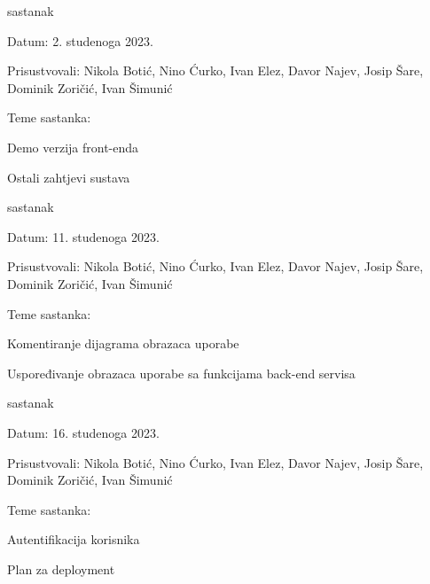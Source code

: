 \begin{packed_enum}
		
		\item  sastanak
			\item[] \begin{packed_item}
				\item Datum: 2. studenoga 2023.
				\item Prisustvovali: Nikola Botić, 
				Nino Ćurko, Ivan Elez,
				Davor Najev, Josip Šare,
				Dominik Zoričić, Ivan Šimunić
				\item Teme sastanka:
				\begin{packed_item}
					\item  Demo verzija front-enda
					\item Ostali zahtjevi sustava
				\end{packed_item}
			\end{packed_item}
			
			\item  sastanak
			\item[] \begin{packed_item}
				\item Datum: 11. studenoga 2023.
				\item Prisustvovali: Nikola Botić, 
				Nino Ćurko, Ivan Elez,
				Davor Najev, Josip Šare,
				Dominik Zoričić, Ivan Šimunić
				\item Teme sastanka:
				\begin{packed_item}
					\item Komentiranje dijagrama obrazaca uporabe
					\item Uspoređivanje obrazaca uporabe sa funkcijama back-end servisa
				\end{packed_item}
			\end{packed_item}
			
			\item  sastanak
			\item[] \begin{packed_item}
				\item Datum: 16. studenoga 2023.
				\item Prisustvovali: Nikola Botić, 
				Nino Ćurko, Ivan Elez,
				Davor Najev, Josip Šare,
				Dominik Zoričić, Ivan Šimunić
				\item Teme sastanka:
				\begin{packed_item}
					\item  Autentifikacija korisnika
					\item Plan za deployment
				\end{packed_item}
			\end{packed_item}
			

\end{packed_enum}
